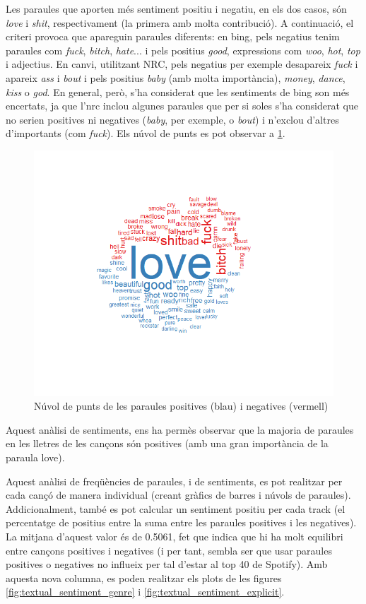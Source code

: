 Les paraules que aporten més sentiment positiu i negatiu, en els dos casos, són \textit{love} i \textit{shit}, respectivament (la primera amb molta contribució). A continuació, el criteri provoca que apareguin paraules diferents: en bing, pels negatius tenim paraules com \textit{fuck}, \textit{bitch}, \textit{hate}... i pels positius \textit{good}, expressions com \textit{woo}, \textit{hot}, \textit{top} i adjectius. En canvi, utilitzant NRC, pels negatius per exemple desapareix \textit{fuck} i apareix \textit{ass} i \textit{bout} i pels positius \textit{baby} (amb molta importància), \textit{money}, \textit{dance}, \textit{kiss} o \textit{god}. En general, però, s'ha considerat que les sentiments de bing son més encertats, ja que l'nrc inclou algunes paraules que per si soles s'ha considerat que no serien positives ni negatives (\textit{baby}, per exemple, o \textit{bout}) i n'exclou d'altres d'importants (com \textit{fuck}). Els núvol de punts es pot observar a \ref{fig:textual_bing_wordcloud}.

\begin{figure}[H]
    \centering
    \includegraphics[width=0.7\linewidth]{Images//8_Textual//Analysis/complete_senti_cloud_bing.png}
    \caption{Núvol de punts de les paraules positives (blau) i negatives (vermell)}
    \label{fig:textual_bing_wordcloud}
\end{figure}

Aquest anàlisi de sentiments, ens ha permès observar que la majoria de paraules en les lletres de les cançons són positives (amb una gran importància de la paraula love).

Aquest anàlisi de freqüències de paraules, i de sentiments, es pot realitzar per cada cançó de manera individual (creant gràfics de barres i núvols de paraules). Addicionalment, també es pot calcular un sentiment positiu per cada track (el percentatge de positius entre la suma entre les paraules positives i les negatives). La mitjana d'aquest valor és de 0.5061, fet que indica que hi ha molt equilibri entre cançons positives i negatives (i per tant, sembla ser que usar paraules positives o negatives no influeix per tal d'estar al top 40 de Spotify). Amb aquesta nova columna, es poden realitzar els plots de les figures \ref{fig:textual_sentiment_genre} i \ref{fig:textual_sentiment_explicit}.

